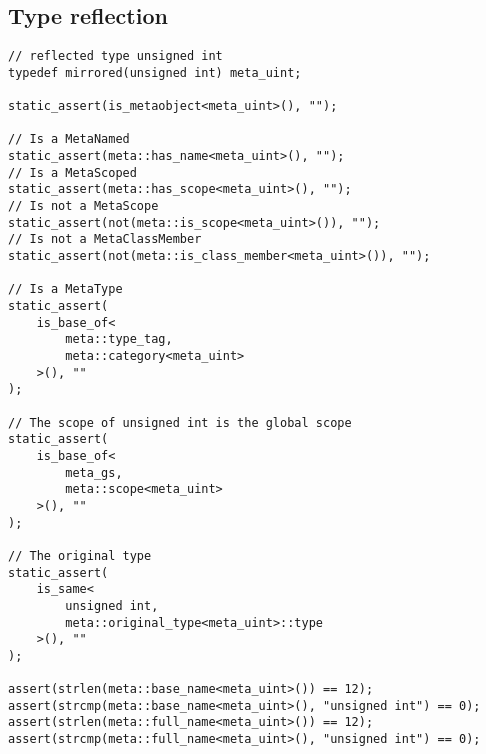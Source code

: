 \subsection{Type reflection}

\begin{verbatim}
// reflected type unsigned int
typedef mirrored(unsigned int) meta_uint;

static_assert(is_metaobject<meta_uint>(), "");

// Is a MetaNamed
static_assert(meta::has_name<meta_uint>(), "");
// Is a MetaScoped
static_assert(meta::has_scope<meta_uint>(), "");
// Is not a MetaScope
static_assert(not(meta::is_scope<meta_uint>()), "");
// Is not a MetaClassMember
static_assert(not(meta::is_class_member<meta_uint>()), "");

// Is a MetaType
static_assert(
	is_base_of<
		meta::type_tag,
		meta::category<meta_uint>
	>(), ""
);

// The scope of unsigned int is the global scope
static_assert(
	is_base_of<
		meta_gs,
		meta::scope<meta_uint>
	>(), ""
);

// The original type
static_assert(
	is_same<
		unsigned int,
		meta::original_type<meta_uint>::type
	>(), ""
);

assert(strlen(meta::base_name<meta_uint>()) == 12);
assert(strcmp(meta::base_name<meta_uint>(), "unsigned int") == 0);
assert(strlen(meta::full_name<meta_uint>()) == 12);
assert(strcmp(meta::full_name<meta_uint>(), "unsigned int") == 0);
\end{verbatim}
